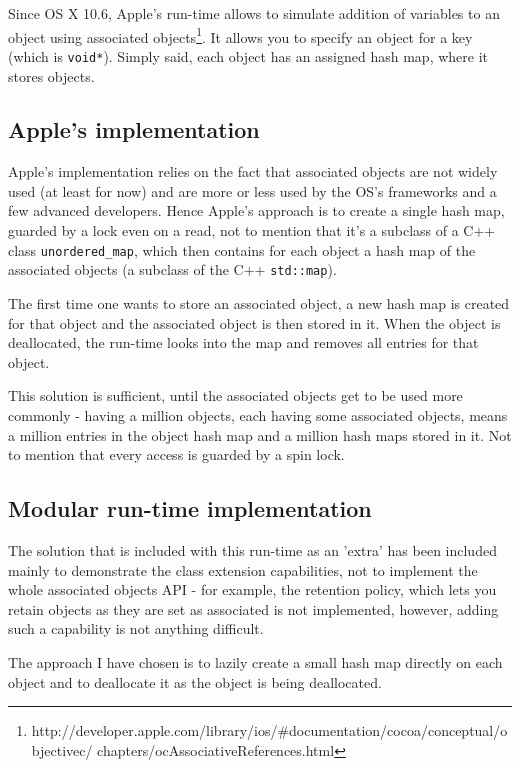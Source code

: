 Since OS X 10.6, Apple's run-time allows to simulate addition of variables to an object using associated objects\footnote{http://developer.apple.com/library/ios/#documentation/cocoa/conceptual/objectivec/ chapters/ocAssociativeReferences.html}. It allows you to specify an object for a key (which is \verb=void*=). Simply said, each object has an assigned hash map, where it stores objects.

\subsection{Apple's implementation}

Apple's implementation relies on the fact that associated objects are not widely used (at least for now) and are more or less used by the OS's frameworks and a few advanced developers. Hence Apple's approach is to create a single hash map, guarded by a lock even on a read, not to mention that it's a subclass of a C++ class \verb=unordered_map=, which then contains for each object a hash map of the associated objects (a subclass of the C++ \verb=std::map=). 

The first time one wants to store an associated object, a new hash map is created for that object and the associated object is then stored in it. When the object is deallocated, the run-time looks into the map and removes all entries for that object.

This solution is sufficient, until the associated objects get to be used more commonly - having a million objects, each having some associated objects, means a million entries in the object hash map and a million hash maps stored in it. Not to mention that every access is guarded by a spin lock.

\subsection{Modular run-time implementation}

The solution that is included with this run-time as an 'extra' has been included mainly to demonstrate the class extension capabilities, not to implement the whole associated objects API - for example, the retention policy, which lets you retain objects as they are set as associated is not implemented, however, adding such a capability is not anything difficult.

The approach I have chosen is to lazily create a small hash map directly on each object and to deallocate it as the object is being deallocated.

